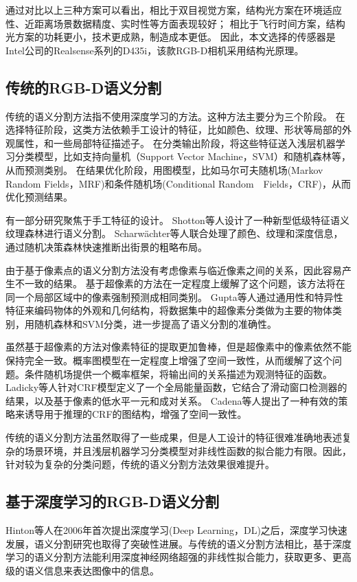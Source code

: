 通过对比以上三种方案可以看出，相比于双目视觉方案，结构光方案在环境适应性、近距离场景数据精度、实时性等方面表现较好；
相比于飞行时间方案，结构光方案的功耗更小，技术更成熟，制造成本更低。
因此，本文选择的传感器是Intel公司的Realsense系列的D435i，该款RGB-D相机采用结构光原理。






\subsection{传统的RGB-D语义分割}
传统的语义分割方法指不使用深度学习的方法。这种方法主要分为三个阶段。
在选择特征阶段，这类方法依赖手工设计的特征，比如颜色、纹理、形状等局部的外观属性，和一些局部特征描述子。
在分类输出阶段，将这些特征送入浅层机器学习分类模型，比如支持向量机（Support Vector Machine，SVM）和随机森林等，从而预测类别。
在结果优化阶段，用图模型，比如马尔可夫随机场(Markov Random Fields，MRF)和条件随机场(Conditional Random　Fields，CRF)，从而优化预测结果。


有一部分研究聚焦于手工特征的设计。
Shotton等人\cite{Shotton08CVPR}设计了一种新型低级特征语义纹理森林进行语义分割。
Scharwächter等人\cite{Scharwächter15IVS}联合处理了颜色、纹理和深度信息，通过随机决策森林快速推断出街景的粗略布局。


由于基于像素点的语义分割方法没有考虑像素与临近像素之间的关系，因此容易产生不一致的结果。
基于超像素的方法在一定程度上缓解了这个问题，该方法将在同一个局部区域中的像素强制预测成相同类别。
Gupta等人\cite{Gupta15IJCV}通过通用性和特异性特征来编码物体的外观和几何结构，将数据集中的超像素分类做为主要的物体类别，用随机森林和SVM分类，进一步提高了语义分割的准确性。


虽然基于超像素的方法对像素特征的提取更加鲁棒，但是超像素中的像素依然不能保持完全一致。概率图模型在一定程度上增强了空间一致性，从而缓解了这个问题。条件随机场提供一个概率框架，将输出间的关系描述为观测特征的函数。
Ladicky等人\cite{Ladicky10ECCV}针对CRF模型定义了一个全局能量函数，它结合了滑动窗口检测器的结果，以及基于像素的低水平一元和成对关系。
Cadena等人\cite{Cadena14ICRA}提出了一种有效的策略来诱导用于推理的CRF的图结构，增强了空间一致性。


传统的语义分割方法虽然取得了一些成果，但是人工设计的特征很难准确地表述复杂的场景环境，并且浅层机器学习分类模型对非线性函数的拟合能力有限。因此，针对较为复杂的分类问题，传统的语义分割方法效果很难提升。



\subsection{基于深度学习的RGB-D语义分割}
Hinton等人\cite{Hinton06Science}在2006年首次提出深度学习(Deep Learning，DL)之后，深度学习快速发展，语义分割研究也取得了突破性进展。与传统的语义分割方法相比，基于深度学习的语义分割方法能利用深度神经网络超强的非线性拟合能力，获取更多、更高级的语义信息来表达图像中的信息。


